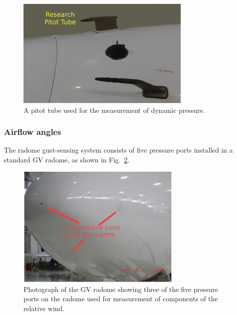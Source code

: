 \documentclass[12pt,twoside,english]{article}\usepackage[]{graphicx}\usepackage[]{color}
\let\OrgIndex\index
\renewcommand*{\index}[1]{\OrgIndex{#1}}
\begin{document}
{\begin{figure}
\noindent \begin{centering}
\includegraphics[width=8.5cm]{SpecialGraphics/PitotTube-r.png}  
\par\end{centering}

\protect\caption{A pitot tube used for the measurement of dynamic pressure.\label{fig:pitot-tube-photo}}
\end{figure}



\subsubsection{Airflow angles\label{sub:Airflow-angles}}

The radome gust-sensing system consists of five pressure ports installed in a standard GV radome, as shown in Fig.~\ref{fig:radome-photo}. 
\begin{figure}
\noindent \begin{centering}
\includegraphics[width=8cm]{SpecialGraphics/RadomePhotoGV.png}  
\par\end{centering}

\protect\caption{Photograph of the GV radome showing three of the five pressure ports on the radome used for measurement of components of the relative wind.\label{fig:radome-photo}} 
\end{figure}

}
\end{document}
